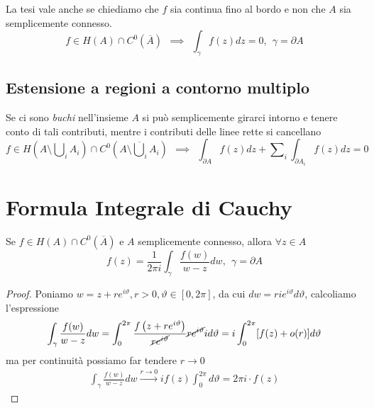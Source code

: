 La tesi vale anche se chiediamo che $f$ sia continua fino al bordo e non che $A$ sia semplicemente connesso.
\begin{equation*}
f\in H(A) \cap C^{0}(\overline{A}) \ \ \implies \ \ \int_{\gamma} f(z) dz = 0, \ \ \gamma = \partial A
\end{equation*}

\subsection{Estensione a regioni a contorno multiplo}

Se ci sono \textit{buchi} nell'insieme $A$ si può semplicemente girarci intorno e tenere conto di tali contributi, mentre i contributi delle linee rette si cancellano
\begin{equation*}
f\in H\left(A\setminus \bigcup\nolimits_{i} A_{i}\right) \cap C^{0}\left(\overline{A\setminus \bigcup\nolimits_{i} A_{i}}\right) \ \ \implies \ \ \int_{\partial A} f(z) dz + \sum\nolimits_{i}\int_{\partial A_{i}} f(z) dz = 0
\end{equation*}

\section{Formula Integrale di Cauchy}

\begin{thm}
Se $f\in H(A) \cap C^{0}(\overline{A})$ e $A$ semplicemente connesso, allora $\forall z\in A$
\begin{equation*}
\boxed{f(z) = \frac{1}{2\pi i}\int_{\gamma}\frac{f(w)}{w - z} dw, \ \ \gamma = \partial A}
\end{equation*}
\end{thm}
\begin{proof}

Poniamo $w = z + re^{i\vartheta}, r > 0, \vartheta \in [0, 2\pi]$, da cui $dw = rie^{i\vartheta} d\vartheta $, calcoliamo l'espressione
\begin{equation*}
\int_{\gamma}\frac{f(w)}{w - z} dw = \int^{2\pi}_{0}\frac{f\left(z + re^{i\vartheta}\right)}{\cancel{re^{i\vartheta}}}\cancel{re^{i\vartheta}} id\vartheta = i\int^{2\pi}_{0}[f(z) + o(r)] d\vartheta
\end{equation*}
ma per continuità possiamo far tendere $r\rightarrow 0$
\begin{gather*}
\int_{\gamma}\frac{f(w)}{w - z} dw\xrightarrow{r\rightarrow 0} if(z)\int^{2\pi}_{0} d\vartheta = 2\pi i \cdot f(z)
\end{gather*}
\end{proof}

